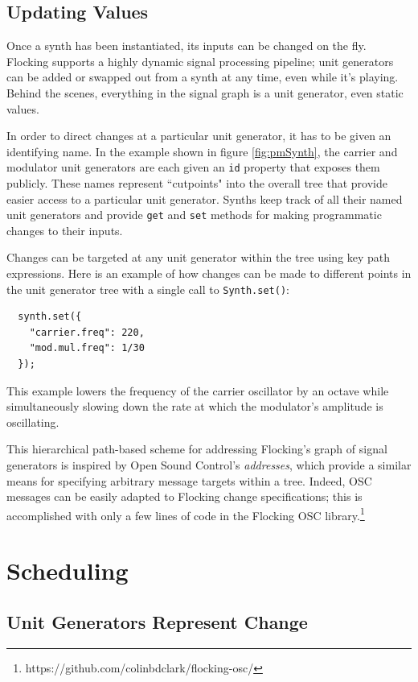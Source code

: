 \documentclass{article}
\begin{document}
\subsection{Updating Values}

Once a synth has been instantiated, its inputs can be changed on the fly. Flocking supports a highly dynamic signal processing pipeline; unit generators can be added or swapped out from a synth at any time, even while it's playing. Behind the scenes, everything in the signal graph is a unit generator, even static values.

In order to direct changes at a particular unit generator, it has to be given an identifying name. In the example shown in figure \ref{fig:pmSynth}, the carrier and modulator unit generators are each given an \verb|id| property that exposes them publicly. These names represent ``cutpoints" into the overall tree that provide easier access to a particular unit generator. Synths keep track of all their named unit generators and provide \verb|get| and \verb|set| methods for making programmatic changes to their inputs.

Changes can be targeted at any unit generator within the tree using key path expressions. Here is an example of how changes can be made to different points in the unit generator tree with a single call to \verb|Synth.set()|:

\begin{verbatim}
  synth.set({
    "carrier.freq": 220,
    "mod.mul.freq": 1/30
  });
\end{verbatim}

This example lowers the frequency of the carrier oscillator by an octave while simultaneously slowing down the rate at which the modulator's amplitude is oscillating.

This hierarchical path-based scheme for addressing Flocking's graph of signal generators is inspired by Open Sound Control's {\it addresses}, which provide a similar means for specifying arbitrary message targets within a tree. Indeed, OSC messages can be easily adapted to Flocking change specifications; this is accomplished with only a few lines of code in the Flocking OSC library.\footnote{https://github.com/colinbdclark/flocking-osc/}

\section{Scheduling} \label{sec:Scheduling}

\subsection{Unit Generators Represent Change}
\end{document}
